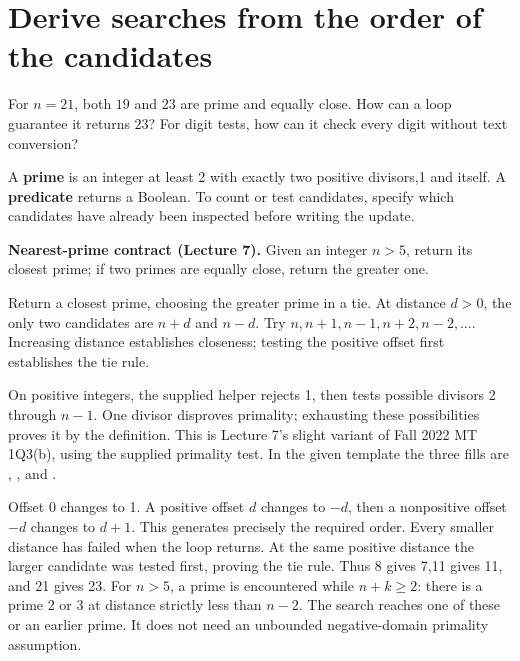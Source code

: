 \documentclass[10pt]{scrartcl}
\begin{document}
\section{Derive searches from the order of the candidates}
\begin{qbox}
For $n=21$, both $19$ and $23$ are prime and equally close. How can a loop guarantee it returns $23$? For digit tests, how can it check every digit without text conversion?
\end{qbox}
A \textbf{prime} is an integer at least 2 with exactly two positive divisors,1 and itself. A \textbf{predicate} returns a Boolean. To count or test candidates, specify which candidates have already been inspected before writing the update.

\textbf{Nearest-prime contract (Lecture 7).} Given an integer $n>5$, return its closest prime; if two primes are equally close, return the greater one.
\begin{motive}
\ii[Want.] Return a closest prime, choosing the greater prime in a tie.
\ii[Know.] At distance $d>0$, the only two candidates are $n+d$ and $n-d$.
 Try $n,n+1,n-1,n+2,n-2,\ldots$. Increasing distance establishes closeness; testing the positive offset first establishes the tie rule.
\end{motive}
On positive integers, the supplied  helper rejects 1, then tests possible divisors 2 through $n-1$. One divisor disproves primality; exhausting these possibilities proves it by the definition.
This is Lecture 7's slight variant of Fall 2022 MT 1Q3(b), using the supplied primality test. In the given template the three fills are , , and .
\begin{fig}
\end{fig}
\par\noindent\begin{minipage}{\linewidth}
\begin{steps}
\ii Offset 0 changes to 1. A positive offset $d$ changes to $-d$, then a nonpositive offset $-d$ changes to $d+1$. This generates precisely the required order.
\ii Every smaller distance has failed when the loop returns. At the same positive distance the larger candidate was tested first, proving the tie rule. Thus 8 gives 7,11 gives 11, and 21 gives 23.
\ii For $n>5$, a prime is encountered while $n+k\ge2$: there is a prime 2 or 3 at distance strictly less than $n-2$. The search reaches one of these or an earlier prime. It does not need an unbounded negative-domain primality assumption.
\end{steps}
\end{minipage}\par
\end{document}
